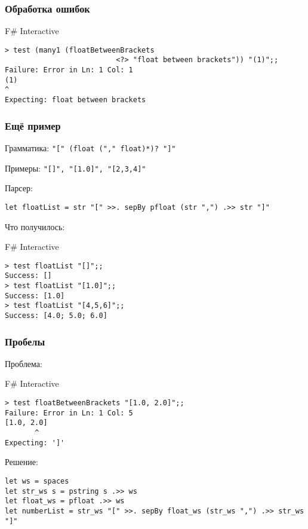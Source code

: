 \documentclass[xetex,mathserif,serif]{beamer}
\begin{document}
    \begin{frame}[fragile]
        \frametitle{Обработка ошибок}
        \begin{alertblock}{F\# Interactive}
            \begin{verbatim}
> test (many1 (floatBetweenBrackets 
                          <?> "float between brackets")) "(1)";;
Failure: Error in Ln: 1 Col: 1
(1)
^
Expecting: float between brackets
            \end{verbatim}
        \end{alertblock}
    \end{frame}

    \begin{frame}[fragile]
        \frametitle{Ещё пример}
        Грамматика: \verb|"[" (float ("," float)*)? "]"|
        
        Примеры: \verb|"[]", "[1.0]", "[2,3,4]"|

        Парсер:
        \begin{verbatim}
let floatList = str "[" >>. sepBy pfloat (str ",") .>> str "]"
        \end{verbatim}

        Что получилось:
        \begin{alertblock}{F\# Interactive}
            \begin{verbatim}
> test floatList "[]";;
Success: []
> test floatList "[1.0]";;
Success: [1.0]
> test floatList "[4,5,6]";;
Success: [4.0; 5.0; 6.0]
            \end{verbatim}
        \end{alertblock}
    \end{frame}

    \begin{frame}[fragile]
        \frametitle{Пробелы}
        Проблема:
        \begin{alertblock}{F\# Interactive}
            \begin{verbatim}
> test floatBetweenBrackets "[1.0, 2.0]";;
Failure: Error in Ln: 1 Col: 5
[1.0, 2.0]
       ^
Expecting: ']'
            \end{verbatim}
        \end{alertblock}
        Решение:
        \begin{verbatim}
let ws = spaces
let str_ws s = pstring s .>> ws
let float_ws = pfloat .>> ws
let numberList = str_ws "[" >>. sepBy float_ws (str_ws ",") .>> str_ws "]"
        \end{verbatim}

    \end{frame}
\end{document}
